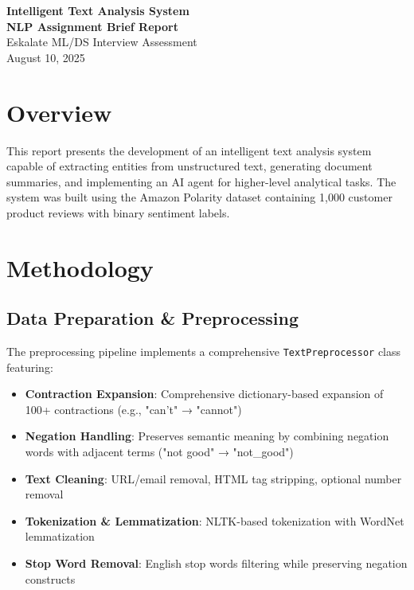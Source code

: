 \documentclass[11pt,a4paper]{article}
\begin{document}
\begin{center}
    {\LARGE \textbf{Intelligent Text Analysis System}}\\
    \vspace{0.3cm}
    {\large \textbf{NLP Assignment Brief Report}}\\
    \vspace{0.2cm}
    {\normalsize Eskalate ML/DS Interview Assessment}\\
    \vspace{0.1cm}
    {\normalsize August 10, 2025}
\end{center}

\section{Overview}

This report presents the development of an intelligent text analysis system capable of extracting entities from unstructured text, generating document summaries, and implementing an AI agent for higher-level analytical tasks. The system was built using the Amazon Polarity dataset containing 1,000 customer product reviews with binary sentiment labels.

\section{Methodology}

\subsection{Data Preparation \& Preprocessing}

The preprocessing pipeline implements a comprehensive \texttt{TextPreprocessor} class featuring:

\begin{itemize}[itemsep=0pt]
    \item \textbf{Contraction Expansion}: Comprehensive dictionary-based expansion of 100+ contractions (e.g., "can't" → "cannot")
    \item \textbf{Negation Handling}: Preserves semantic meaning by combining negation words with adjacent terms ("not good" → "not\_good")
    \item \textbf{Text Cleaning}: URL/email removal, HTML tag stripping, optional number removal
    \item \textbf{Tokenization \& Lemmatization}: NLTK-based tokenization with WordNet lemmatization
    \item \textbf{Stop Word Removal}: English stop words filtering while preserving negation constructs
\end{itemize}
\end{document}
